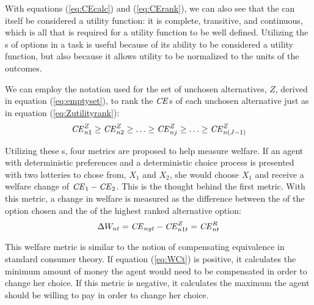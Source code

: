 \addtocounter{footnote}{-1}

With equations (\ref{eq:CEcalc}) and (\ref{eq:CErank}), we can also see that the {\CE} can itself be considered a utility function: it is complete, transitive, and continuous, which is all that is required for a utility function to be well defined.
Utilizing the {\CE}s of options in a task is useful because of its ability to be considered a utility function, but also because it allows utility to be normalized to the units of the outcomes.

We can employ the notation used for the set of unchosen alternatives, $Z$, derived in equation (\ref{eq:emptyset}), to rank the ${\mathit{CE}}$s of each unchosen alternative just as in equation (\ref{eq:Zutilityrank}):
\begin{equation}
	\label{eq:CEZ}
	{\ensuremath{\mathit{CE}}}_{n1}^Z \geq {\ensuremath{\mathit{CE}}}_{n2}^Z \geq \ldots \geq {\ensuremath{\mathit{CE}}}_{nj}^Z \geq \ldots \geq {\ensuremath{\mathit{CE}}}_{n(J-1)}^Z 
\end{equation}

Utilizing these {\CE}s, four metrics are proposed to help measure welfare.
If an agent with deterministic preferences and a deterministic choice process is presented with two lotteries to chose from, $X_1$ and $X_2$, she would choose $X_1$ and receive a welfare change of ${\mathit{CE}}_1 - {\mathit{CE}}_2$.
This is the thought behind the first metric.
With this metric, a change in welfare is measured as the difference between the {\CE} of the option chosen and the {\CE} of the highest ranked alternative option:
\begin{equation}
	\label{eq:WCt}
	\Delta W_{nt} = {\mathit{CE}}_{nyt} - {\mathit{CE}}_{n1t}^Z = {\mathit{CE}}_{nt}^R
\end{equation}

This welfare metric is similar to the notion of compensating equivalence in standard consumer theory.
If equation (\ref{eq:WCt}) is positive, it calculates the minimum amount of money the agent would need to be compensated in order to change her choice.
If this metric is negative, it calculates the maximum the agent should be willing to pay in order to change her choice.

